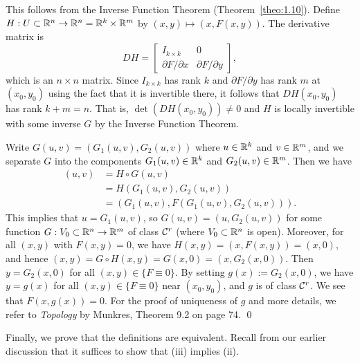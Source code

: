 \begin{pf}
    This follows from the Inverse Function Theorem (Theorem~\ref{theo:1.10}).
    Define $H : U \subset \mathbb{R}^n \to \mathbb{R}^n = \mathbb{R}^k \times \mathbb{R}^m$ by $(x, y) 
    \mapsto (x, F(x, y))$. The derivative matrix is
    \[ DH = \left[ \begin{array}{c|c}
        I_{k\times k} & 0 \\ \hline
        \partial F/\partial x & \partial F/\partial y
    \end{array} \right], \]
    which is an $n \times n$ matrix. 
    Since $I_{k\times k}$ has rank $k$ and $\partial F/\partial y$ has 
    rank $m$ at $(x_0, y_0)$ using the fact that it is invertible there, 
    it follows that $DH(x_0, y_0)$ has rank $k + m = n$. That is, 
    $\det(DH(x_0, y_0)) \neq 0$ and $H$ is locally invertible with 
    some inverse $G$ by the Inverse Function Theorem.

    Write $G(u, v) = (G_1(u, v), G_2(u, v))$ where $u \in \mathbb{R}^k$ and
    $v \in \mathbb{R}^m$, and we separate $G$ into the components $G_1(u, v) \in \mathbb{R}^k$ and 
    $G_2(u, v) \in \mathbb{R}^m$. Then we have 
    \begin{align*}
        (u, v) &= H \circ G(u, v) \\ 
        &= H(G_1(u, v), G_2(u, v)) \\ 
        &= (G_1(u, v), F(G_1(u, v), G_2(u, v))). 
    \end{align*}
    This implies that $u = G_1(u, v)$, so $G(u, v) = (u, G_2(u, v))$ for some 
    function $G : V_0 \subset \mathbb{R}^n \to \mathbb{R}^m$ of class ${\cal C}^r$ (where $V_0 
    \subset \mathbb{R}^n$ is open). Moreover, for all $(x, y)$ with $F(x, y) = 0$, 
    we have $H(x, y) = (x, F(x, y)) = (x, 0)$,
    and hence $(x, y) = G \circ H(x, y) = G(x, 0) = (x, G_2(x, 0))$. Then 
    $y = G_2(x, 0)$ for all $(x, y) \in \{F \equiv 0\}$. By setting 
    $g(x) := G_2(x, 0)$, we have $y = g(x)$ for all $(x, y) \in \{F \equiv 0\}$
    near $(x_0, y_0)$, and $g$ is of class ${\cal C}^r$. We see that 
    $F(x, g(x)) = 0$.
    For the proof of uniqueness of $g$ and more details, we refer to 
    \emph{Topology} by Munkres, Theorem 9.2 on page 74. \qed 
\end{pf}\vspace{-0.25cm} 

Finally, we prove that the definitions are equivalent. Recall from 
our earlier discussion that it suffices to show that (iii) implies (ii). 

